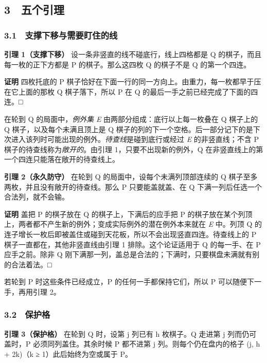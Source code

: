 \documentclass[
  a4paper,
]{article}
\begin{document}
\subsection{3　五个引理}\label{ux4e94ux4e2aux5f15ux7406}

\subsubsection{3.1 支撑下移与需要盯住的线}\label{ux652fux6491ux4e0bux79fbux4e0eux9700ux8981ux76efux4f4fux7684ux7ebf}

\textbf{引理 1（支撑下移）} 设一条非竖直的线不碰底行，线上四格都是 Q
的棋子，而且每一枚的正下方都是 P 的棋子。那么这四枚 Q 的棋子不是 Q
的第一个四连。

\textbf{证明} 四枚托底的 P
棋子恰好在下面一行的同一方向上。由重力，每一枚都早于压在它上面的那枚 Q
棋子落下，所以 P 在 Q 的最后一手之前已经完成了下面的四连。□

在轮到 Q 的局面中，\emph{例外集} \emph{E}
由两部分组成：底行以上每一枚叠在 Q 棋子上的 Q 棋子，以及每个未满且顶上是
Q
棋子的列的下一个空格。后一部分记下的是下次进入该列时可能出现的例外。\emph{待查线}是碰到底行或经过
\emph{E} 的非竖直线；不含 P 棋子的待查线称为\emph{敞开的}。由引理
1，只要不出现新的例外，Q
在非竖直线上的第一个四连只能落在敞开的待查线上。

\textbf{引理 2（永久防守）} 在轮到 Q 的局面中，设每个未满列顶部连续的 Q
棋子至多两枚，并且没有敞开的待查线。那么 P 只要能盖就盖、在 Q
下满一列后任选一个合法列，就不会输。

\textbf{证明} 盖把 P 的棋子放在 Q 的棋子上，下满后的应手把 P
的棋子放在某个列顶上，两者都不产生新的例外；变成实际例外的潜在例外本来就在
\emph{E} 中。列顶 Q
的连子增长一枚后即被盖住或碰到天花板，所以不会出现竖直四连。待查线上的 P
棋子一直都在，其他非竖直线由引理 1 排除。这个论证适用于 Q 的每一手、在 P
应手之前。除非 Q
刚下满那一列，盖总是合法的；下满时，只要棋盘未满就有别的合法着法。□

若轮到 P 时这些条件已经成立，P 的任何一手都保持它们，所以 P
可以随便下一手，再用引理 2。

\subsubsection{3.2 保护格}\label{ux4fddux62a4ux683c}

\textbf{引理 3（保护格）} 在轮到 Q 时，设第 j 列已有 h 枚棋子。Q 走进第
j 列而仍可盖时，P 必须同列盖住。其余时候 P 都不进第 j
列。则每个仍在盘内的格子 (j, h + 2k)（k ≥ 1）此后始终为空或属于 P。
\end{document}
